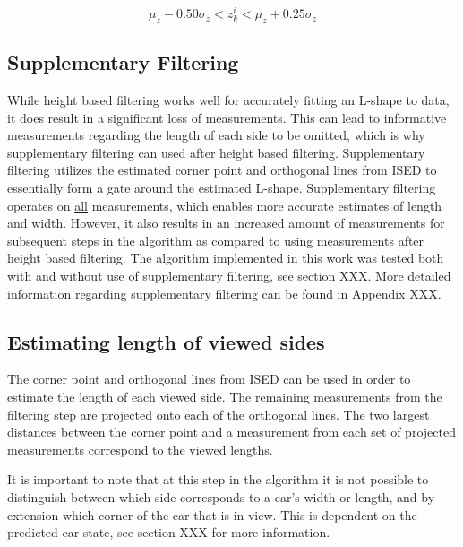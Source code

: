 \begin{equation}
     \mu_z - 0.50\sigma_z < z_k^i < \mu_z + 0.25\sigma_z
\end{equation}

\subsection{Supplementary Filtering}
While height based filtering works well for accurately fitting an L-shape to data, it does result in a significant loss of measurements. This can lead to informative measurements regarding the length of each side to be omitted, which is why supplementary filtering can used after height based filtering. Supplementary filtering utilizes the estimated corner point and orthogonal lines from ISED to essentially form a gate around the estimated L-shape. Supplementary filtering operates on \underline{all} measurements, which enables more accurate estimates of length and width. However, it also results in an increased amount of measurements for subsequent steps in the algorithm as compared to using measurements after height based filtering. The algorithm implemented in this work was tested both with and without use of supplementary filtering, see section XXX.
More detailed information regarding supplementary filtering can be found in Appendix XXX.

\subsection{Estimating length of viewed sides}

The corner point and orthogonal lines from ISED can be used in order to estimate the length of each viewed side. The remaining measurements from the filtering step are projected onto each of the orthogonal lines. The two largest distances between the corner point and a measurement from each set of projected measurements correspond to the viewed lengths. 

It is important to note that at this step in the algorithm it is not possible to distinguish between which side corresponds to a car's width or length, and by extension which corner of the car that is in view. This is dependent on the predicted car state, see section XXX for more information.

